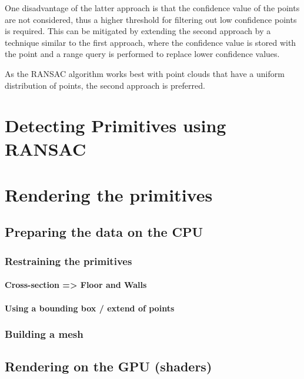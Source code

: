 One disadvantage of the latter approach is that the confidence value of the points are not considered,
thus a higher threshold for filtering out low confidence points is required.
This can be mitigated by extending the second approach by a technique similar to the first approach,
where the confidence value is stored with the point and a range query is performed to replace lower confidence values.

As the RANSAC algorithm works best with point clouds that have a uniform distribution of points, the second approach is preferred.


\section{Detecting Primitives using RANSAC}

\parencite{schnabel_efficient_2007}


\section{Rendering the primitives}

\subsection{Preparing the data on the CPU}

\subsubsection{Restraining the primitives}

\paragraph{Cross-section => Floor and Walls}

\paragraph{Using a bounding box / extend of points}

\subsubsection{Building a mesh}

\subsection{Rendering on the GPU (shaders)}
